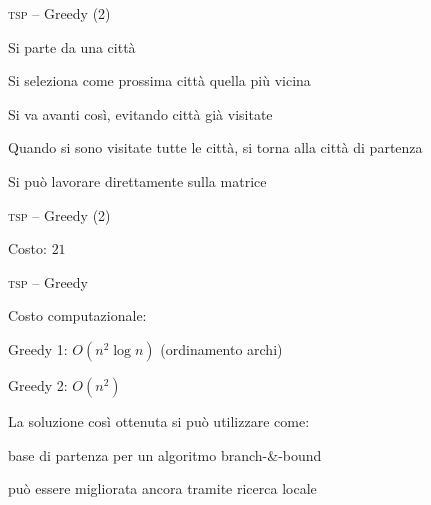 \begin{frame}{\textsc{tsp} -- Greedy (2)}

\vspace{-9pt}
\begin{myboxtitle}
\BIL
\item Si parte da una città
\item Si seleziona come prossima città quella più vicina
\item Si va avanti così, evitando città già visitate
\item Quando si sono visitate tutte le città, si torna alla città di
partenza
\item Si può lavorare direttamente sulla matrice
\EIL
\end{myboxtitle}

\end{frame}

\begin{frame}{\textsc{tsp} -- Greedy (2)}

\vspace{-9pt}

\alert{
\bigskip
{}Costo: $21$
}


\end{frame}


\begin{frame}{\textsc{tsp} -- Greedy}

\vspace{-9pt}
\BIL
\item Costo computazionale:
  \BI
  \item Greedy 1: $O(n^2 \log n)$ (ordinamento archi)
  \item Greedy 2: $O(n^2)$
  \EI
\item La soluzione così ottenuta si può utilizzare come:
\BI
\item base di partenza per un algoritmo branch-\&-bound
\item può essere migliorata ancora tramite ricerca locale
\EI
\EIL

\end{frame}


